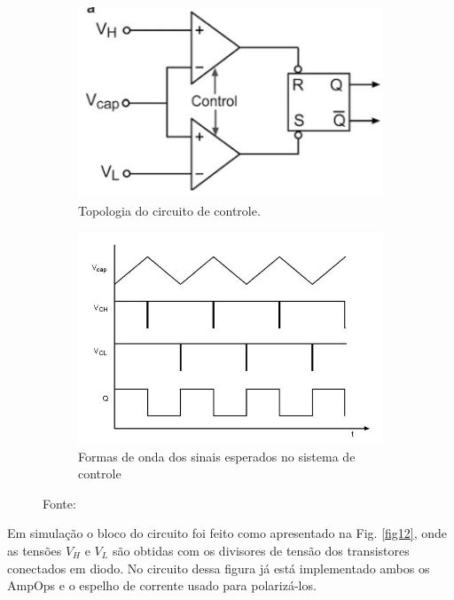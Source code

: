 \begin{figure}[htb]
     \centering
     \begin{subfigure}[b]{0.49\textwidth}
         \centering
         \includegraphics[width=\textwidth]{figuras/control_topology.png}
         \caption{Topologia do circuito de controle.}
         \label{fig10}
     \end{subfigure}
     \hfill
     \begin{subfigure}[b]{0.49\textwidth}
         \centering
         \includegraphics[width=\textwidth]{figuras/controle_waves.jpg}
         \caption{Formas de onda dos sinais esperados no sistema de controle}
         \label{fig11}
     \end{subfigure}
        \caption{Fonte:\cite{livroprincipal}}
        \label{fig:control}
\end{figure}

Em simulação o bloco do circuito foi feito como apresentado na Fig. \ref{fig12}, onde as tensões $V_H$ e $V_L$ são obtidas com os divisores de tensão dos transistores conectados em diodo. No circuito dessa figura já está implementado ambos os AmpOps e o espelho de corrente usado para polarizá-los.

